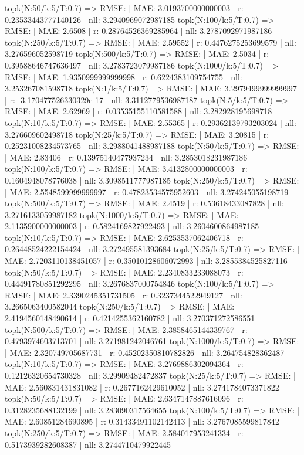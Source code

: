 topk(N:50/k:5/T:0.7) => RMSE: | MAE: 3.0193700000000003 | r: 0.23533443777140126 | nll: 3.2940969072987185
topk(N:100/k:5/T:0.7) => RMSE: | MAE: 2.6508 | r: 0.28764526369285964 | nll: 3.2787092971987186
topk(N:250/k:5/T:0.7) => RMSE: | MAE: 2.59552 | r: 0.4476275253699579 | nll: 3.276596052598719
topk(N:500/k:5/T:0.7) => RMSE: | MAE: 2.5034 | r: 0.39588646747636497 | nll: 3.2783723079987186
topk(N:1000/k:5/T:0.7) => RMSE: | MAE: 1.9350999999999998 | r: 0.6224383109754755 | nll: 3.253267081598718
topk(N:1/k:5/T:0.7) => RMSE: | MAE: 3.2979499999999997 | r: -3.170477526330329e-17 | nll: 3.3112779536987187
topk(N:5/k:5/T:0.7) => RMSE: | MAE: 2.62969 | r: 0.03535155110581588 | nll: 3.282928195698718
topk(N:10/k:5/T:0.7) => RMSE: | MAE: 2.55365 | r: 0.29362139793203024 | nll: 3.276609602498718
topk(N:25/k:5/T:0.7) => RMSE: | MAE: 3.20815 | r: 0.25231008234573765 | nll: 3.2988041488987188
topk(N:50/k:5/T:0.7) => RMSE: | MAE: 2.83406 | r: 0.13975140477937234 | nll: 3.2853018231987186
topk(N:100/k:5/T:0.7) => RMSE: | MAE: 3.4132800000000003 | r: 0.1604948078776038 | nll: 3.3098511777987185
topk(N:250/k:5/T:0.7) => RMSE: | MAE: 2.5548599999999997 | r: 0.47823534575952603 | nll: 3.274245055198719
topk(N:500/k:5/T:0.7) => RMSE: | MAE: 2.4519 | r: 0.53618433087828 | nll: 3.2716133059987182
topk(N:1000/k:5/T:0.7) => RMSE: | MAE: 2.1135900000000003 | r: 0.5824169827922493 | nll: 3.2604600864987185
topk(N:10/k:5/T:0.7) => RMSE: | MAE: 2.6253537062406718 | r: 0.26448524222154424 | nll: 3.272495581393684
topk(N:25/k:5/T:0.7) => RMSE: | MAE: 2.7203110138451057 | r: 0.35010128606072993 | nll: 3.2855384525827116
topk(N:50/k:5/T:0.7) => RMSE: | MAE: 2.2340833233088073 | r: 0.44491780851292295 | nll: 3.2676837000754846
topk(N:100/k:5/T:0.7) => RMSE: | MAE: 2.3390245351731505 | r: 0.3237344522949127 | nll: 3.2665063400582044
topk(N:250/k:5/T:0.7) => RMSE: | MAE: 2.4194560148490614 | r: 0.4214255362160782 | nll: 3.270371272586551
topk(N:500/k:5/T:0.7) => RMSE: | MAE: 2.3858465144339767 | r: 0.4793974603713701 | nll: 3.271981242046761
topk(N:1000/k:5/T:0.7) => RMSE: | MAE: 2.320749705687731 | r: 0.45202350810782826 | nll: 3.264754828362487
topk(N:10/k:5/T:0.7) => RMSE: | MAE: 3.2769886302094364 | r: 0.12126320654730328 | nll: 3.29909482472837
topk(N:25/k:5/T:0.7) => RMSE: | MAE: 2.560831431831082 | r: 0.2677162429610052 | nll: 3.2741784073371822
topk(N:50/k:5/T:0.7) => RMSE: | MAE: 2.6347147887616096 | r: 0.3128235688132199 | nll: 3.283090317564655
topk(N:100/k:5/T:0.7) => RMSE: | MAE: 2.60851284690895 | r: 0.31433491102142413 | nll: 3.2767085599817842
topk(N:250/k:5/T:0.7) => RMSE: | MAE: 2.584017953241334 | r: 0.5173939282608387 | nll: 3.2744710479922445
